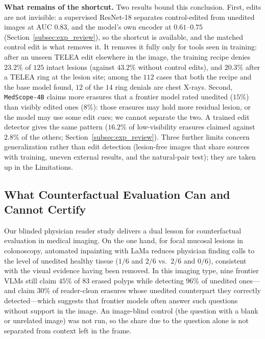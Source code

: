 \documentclass[5p,times,twocolumn,authoryear]{elsarticle}
\begin{document}
\textbf{What remains of the shortcut.} Two results bound this conclusion. First, edits are not invisible: a supervised ResNet-18 separates control-edited from unedited images at AUC $0.83$, and the model's own encoder at $0.61$--$0.75$ (Section~\ref{subsec:exp_review}), so the shortcut is available, and the matched control edit is what removes it. It removes it fully only for tools seen in training: after an unseen TELEA edit elsewhere in the image, the training recipe denies $23.2\%$ of $125$ intact lesions (against $43.2\%$ without control edits), and $20.3\%$ after a TELEA ring at the lesion site; among the $112$ cases that both the recipe and the base model found, $12$ of the $14$ ring denials are chest X-rays. Second, \texttt{MedScope-4B} claims more erasures that a frontier model rated unedited ($15\%$) than visibly edited ones ($8\%$): those erasures may hold more residual lesion, or the model may use some edit cues; we cannot separate the two. A trained edit detector gives the same pattern ($16.2\%$ of low-visibility erasures claimed against $2.8\%$ of the others; Section~\ref{subsec:exp_review}). Three further limits concern generalization rather than edit detection (lesion-free images that share sources with training, uneven external results, and the natural-pair test); they are taken up in the Limitations.

\subsection{What Counterfactual Evaluation Can and Cannot Certify}
\label{subsec:disc_certify}
Our blinded physician reader study delivers a dual lesson for counterfactual evaluation in medical imaging. On the one hand, for focal mucosal lesions in colonoscopy, automated inpainting with LaMa reduces physician finding calls to the level of unedited healthy tissue ($1/6$ and $2/6$ vs.\ $2/6$ and $0/6$), consistent with the visual evidence having been removed. In this imaging type, nine frontier VLMs still claim $45\%$ of $83$ erased polyps while detecting $96\%$ of unedited ones---and claim $30\%$ of reader-clean erasures whose unedited counterpart they correctly detected---which suggests that frontier models often answer such questions without support in the image. An image-blind control (the question with a blank or unrelated image) was not run, so the share due to the question alone is not separated from context left in the frame.
\end{document}
